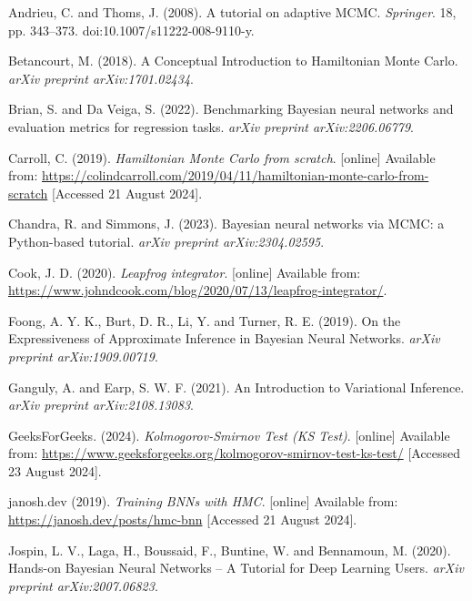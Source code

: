 \documentclass[conference]{IEEEtran}
\begin{document}
\begin{thebibliography}{00}

 Andrieu, C. and Thoms, J. (2008). A tutorial on adaptive MCMC. \textit{Springer}. 18, pp. 343–373. doi:10.1007/s11222-008-9110-y.

 Betancourt, M. (2018). A Conceptual Introduction to Hamiltonian Monte Carlo. \textit{arXiv preprint arXiv:1701.02434}.

 Brian, S. and Da Veiga, S. (2022). Benchmarking Bayesian neural networks and evaluation metrics for regression tasks. \textit{arXiv preprint arXiv:2206.06779}.

 Carroll, C. (2019). \textit{Hamiltonian Monte Carlo from scratch}. [online] Available from: \url{https://colindcarroll.com/2019/04/11/hamiltonian-monte-carlo-from-scratch} [Accessed 21 August 2024].

 Chandra, R. and Simmons, J. (2023). Bayesian neural networks via MCMC: a Python-based tutorial. \textit{arXiv preprint arXiv:2304.02595}.

 Cook, J. D. (2020). \textit{Leapfrog integrator}. [online] Available from: \url{https://www.johndcook.com/blog/2020/07/13/leapfrog-integrator/}.

 Foong, A. Y. K., Burt, D. R., Li, Y. and Turner, R. E. (2019). On the Expressiveness of Approximate Inference in Bayesian Neural Networks. \textit{arXiv preprint arXiv:1909.00719}.

 Ganguly, A. and Earp, S. W. F. (2021). An Introduction to Variational Inference. \textit{arXiv preprint arXiv:2108.13083}.

 GeeksForGeeks. (2024). \textit{Kolmogorov-Smirnov Test (KS Test)}. [online] Available from: \url{https://www.geeksforgeeks.org/kolmogorov-smirnov-test-ks-test/} [Accessed 23 August 2024].

 janosh.dev (2019). \textit{Training BNNs with HMC}. [online] Available from: \url{https://janosh.dev/posts/hmc-bnn} [Accessed 21 August 2024].

 Jospin, L. V., Laga, H., Boussaid, F., Buntine, W. and Bennamoun, M. (2020). Hands-on Bayesian Neural Networks – A Tutorial for Deep Learning Users. \textit{arXiv preprint arXiv:2007.06823}.


\end{thebibliography}
\end{document}

